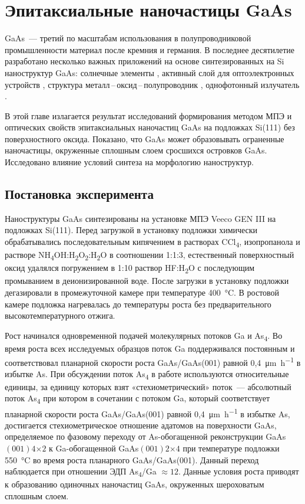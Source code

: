 \chapter{Эпитаксиальные наночастицы GaAs}\label{ch:ch5}

GaAs~--- третий по масштабам использования в полупроводниковой промышленности материал после кремния и германия. В последнее десятилетие разработано несколько важных приложений на основе синтезированных на Si наноструктур GaAs: солнечные элементы \cite{Chu2014}, активный слой для оптоэлектронных устройств \cite{Bietti2009}, структура металл\,--\,оксид\,--\,полупроводник \cite{Zhao2009}, однофотонный излучатель \cite{Sanguinetti2015}.

В этой главе излагается результат исследований формирования методом МПЭ и оптических свойств эпитаксиальных наночастиц GaAs на подложках Si(111) без поверхностного оксида. Показано, что GaAs может образовывать ограненные наночастицы, окруженные сплошным слоем сросшихся островков GaAs. Исследовано влияние условий синтеза на морфологию наноструктур.

\section{Постановка эксперимента}\label{sec:ch5/sec1}

Наноструктуры GaAs синтезированы на установке МПЭ Veeco GEN III на подложках Si(111). Перед загрузкой в установку подложки химически обрабатывались последовательным кипячением в растворах CCl\textsubscript{4}, изопропанола и растворе NH\textsubscript{4}OH:H\textsubscript{2}O\textsubscript{2}:H\textsubscript{2}O в соотношении 1:1:3, естественный поверхностный оксид удалялся погружением в 1:10 раствор HF:H\textsubscript{2}O с последующим промыванием в деионизированной воде. После загрузки в установку подложки дегазировали в промежуточной камере при температуре 400~\si{\degreeCelsius}. В ростовой камере подложка нагревалась до температуры роста без предварительного высокотемпературного отжига.

Рост начинался одновременной подачей молекулярных потоков Ga и As\textsubscript{4}. Во время роста всех исследуемых образцов поток Ga поддерживался постоянным и соответствовал планарной скорости роста GaAs/GaAs(001) равной 0,4~\si{\micro\metre\per\hour} в избытке As. При обсуждении поток As\textsubscript{4} в работе используются относительные единицы, за единицу которых взят «стехиометрический» поток~--- абсолютный поток As\textsubscript{4} при котором в сочетании с потоком Ga, который соответствует планарной скорости роста GaAs/GaAs(001) равной 0,4~\si{\micro\metre\per\hour} в избытке As, достигается стехиометрическое отношение адатомов на поверхности GaAs, определяемое по фазовому переходу от As-обогащенной реконструкции GaAs\((001)4\)\(\times\)\(2\) к Ga-обогащенной GaAs\((001)2\)\(\times\)\(4\) при температуре подложки 550~\si{\degreeCelsius} во время роста планарного GaAs/GaAs(001). Данный переход наблюдается при отношении ЭДП As\textsubscript{4}/Ga \(\approx 12\). Данные условия роста приводят к образованию одиночных наночастиц GaAs, окруженных шероховатым сплошным слоем.

